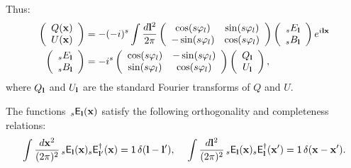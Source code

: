 \documentclass[a4paper,10pt]{article}
\begin{document}
    Thus:
    \begin{align}
      \left(\begin{array}{c}
       Q({\bf x}) \\ U({\bf x})
      \end{array}\right)
      &=-(-i)^s
      \int\frac{d{\bf l}^2}{2\pi}
      \left(\begin{array}{cc}
              \cos(s\varphi_l) & \sin(s\varphi_l) \\
             -\sin(s\varphi_l) & \cos(s\varphi_l) \\
            \end{array}\right)
      \left(\begin{array}{c}
       _sE_{\bf l} \\ _sB_{\bf l}
      \end{array}\right)e^{i{\bf l}{\bf x}}\\
      \left(\begin{array}{c}
       _sE_{\bf l} \\ _sB_{\bf l}
      \end{array}\right)
      &=-i^s
      \left(\begin{array}{cc}
              \cos(s\varphi_l) & -\sin(s\varphi_l) \\
              \sin(s\varphi_l) &  \cos(s\varphi_l) \\
            \end{array}\right)
      \left(\begin{array}{c}
       Q_{\bf l} \\ U_{\bf l}
      \end{array}\right),
    \end{align}
    where $Q_{\bf l}$ and $U_{\bf l}$ are the standard Fourier transforms of $Q$ and $U$.
    
    The functions $\,_s{\sf E}_{\bf l}({\bf x})$ satisfy the following orthogonality and completeness relations:
    \begin{equation}
      \int \frac{d{\bf x}^2}{(2\pi)^2}\,_s{\sf E}_{\bf l}({\bf x})_s{\sf E}^\dag_{{\bf l}'}({\bf x})={\sf 1}\,\delta({\bf l}-{\bf l}'),\hspace{12pt}
      \int \frac{d{\bf l}^2}{(2\pi)^2}\,_s{\sf E}_{\bf l}({\bf x})_s{\sf E}^\dag_{{\bf l}}({\bf x}')={\sf 1}\,\delta({\bf x}-{\bf x}').
    \end{equation}
\end{document}
